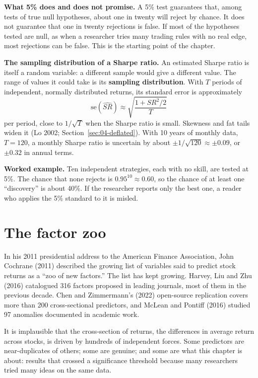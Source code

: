 \textbf{What 5\% does and does not promise.} A 5\% test guarantees that, among tests of true null hypotheses, about one in twenty will reject by chance. It does not guarantee that one in twenty rejections is false. If most of the hypotheses tested are null, as when a researcher tries many trading rules with no real edge, most rejections can be false. This is the starting point of the chapter.

\textbf{The sampling distribution of a Sharpe ratio.} An estimated Sharpe ratio is itself a random variable: a different sample would give a different value. The range of values it could take is its \textbf{sampling distribution}. With $T$ periods of independent, normally distributed returns, its standard error is approximately
\begin{equation}
  \mathrm{se}(\widehat{SR}) \approx \sqrt{\frac{1 + SR^2/2}{T}}
  \label{eq:04-sese}
\end{equation}
per period, close to $1/\sqrt{T}$ when the Sharpe ratio is small. Skewness and fat tails widen it (Lo 2002; Section~\ref{sec:04-deflated}). With 10 years of monthly data, $T = 120$, a monthly Sharpe ratio is uncertain by about $\pm 1/\sqrt{120} \approx \pm 0.09$, or $\pm 0.32$ in annual terms.

\textbf{Worked example.} Ten independent strategies, each with no skill, are tested at 5\%. The chance that none rejects is $0.95^{10} \approx 0.60$, so the chance of at least one ``discovery'' is about 40\%. If the researcher reports only the best one, a reader who applies the 5\% standard to it is misled.

\section{The factor zoo}
\label{sec:04-zoo}

In his 2011 presidential address to the American Finance Association, John Cochrane (2011) described the growing list of variables said to predict stock returns as a ``zoo of new factors.'' The list has kept growing. Harvey, Liu and Zhu (2016) catalogued 316 factors proposed in leading journals, most of them in the previous decade. Chen and Zimmermann's (2022) open-source replication covers more than 200 cross-sectional predictors, and McLean and Pontiff (2016) studied 97 anomalies documented in academic work.

It is implausible that the cross-section of returns, the differences in average return across stocks, is driven by hundreds of independent forces. Some predictors are near-duplicates of others; some are genuine; and some are what this chapter is about: results that crossed a significance threshold because many researchers tried many ideas on the same data.

